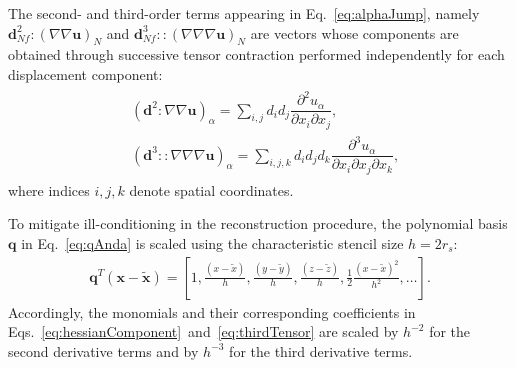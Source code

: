 \documentclass[review,3p]{elsarticle}
\newcommand{\bb}{\boldsymbol}
\begin{document}
The second- and third-order terms appearing in Eq.~\eqref{eq:alphaJump}, namely $\bb{d}_{Nf}^2 \!:\! (\nabla \nabla \bb{u})_N$ and $\bb{d}_{Nf}^3 \!::\! (\nabla \nabla \nabla \bb{u})_N$ are vectors whose components are obtained through successive tensor contraction performed independently for each displacement component:
%
\begin{eqnarray}
	\begin{split}
		&\left(\bb{d}^2 \!:\! \nabla \nabla \bb{u} \right)_{\alpha} = \sum_{i,j} d_i d_j \dfrac{\partial^2 u_{\alpha}}{\partial x_i \partial x_j}, \\
		& \left(\bb{d}^3 \!::\! \nabla \nabla \nabla \bb{u} \right)_{\alpha} = \sum_{i,j,k} d_i d_j d_k \dfrac{\partial^3 u_{\alpha}}{\partial x_i \partial x_j \partial x_k},
	\end{split}
\end{eqnarray}
where indices $i,j,k$ denote spatial coordinates.

To mitigate ill-conditioning in the reconstruction procedure, the polynomial basis $\mathbf{q}$ in Eq.~\eqref{eq:qAnda} is scaled using the characteristic stencil size $h = 2r_s$:
\begin{eqnarray}
	\mathbf{q}^T(\bb{x}-\tilde{\bb{x}}) = \left[1, \frac{(x-\tilde{x})}{h}, \frac{(y-\tilde{y})}{h}, \frac{(z-\tilde{z})}{h}, \frac{1}{2}\frac{(x-\tilde{x})^2}{h^2}, \dots \right].
\end{eqnarray}
Accordingly, the monomials and their corresponding coefficients in Eqs.~\eqref{eq:hessianComponent}~and~\eqref{eq:thirdTensor} are scaled by $h^{-2}$ for the second derivative terms and by $h^{-3}$ for the third derivative terms.
%
%
%
\end{document}
